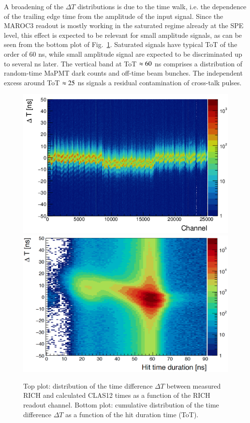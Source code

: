 \documentclass[5p,times,twocolumn]{elsarticle}
\def\MaPMT{MaPMT }
\begin{document}
A broadening of the $\Delta T$ distributions is due to the time walk, i.e. the dependence of the trailing edge time from the amplitude of the input signal. Since the MAROC3 readout is mostly working in the saturated regime already at the SPE level, this effect is expected to be relevant for small amplitude signals, as can be seen from the bottom plot of Fig.~\ref{fig:Time_uncorr}. Saturated signals have typical ToT of the order of 60 ns, while small amplitude signal are expected to be discriminated up to several ns later. The vertical band at ToT $\rm \approx 60$ ns comprises a distribution of random-time \MaPMT dark counts and off-time beam bunches. The independent excess around ToT $\rm \approx 25$ ns signals a residual contamination of cross-talk pulses.



\begin{figure}[t]
\begin{center}
\includegraphics[width=0.9\columnwidth]{dt_vs_anode_nocor.png}
\includegraphics[width=0.9\columnwidth]{dt_vs_dur_nocor.png}
\end{center}
\caption{Top plot: distribution of the time difference $\Delta T$ between measured RICH and calculated CLAS12 times as a function of the RICH readout channel. Bottom plot: cumulative distribution of the time difference $\Delta T$ as a function of the hit duration time (ToT).}
\label{fig:Time_uncorr}
\end{figure}
\end{document}
